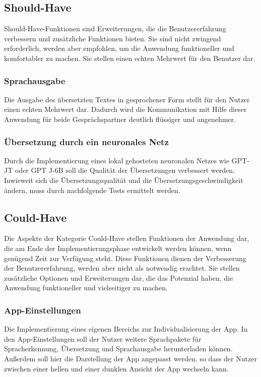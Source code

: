 \subsection{Should-Have}
Should-Have-Funktionen sind Erweiterungen, die die Benutzererfahrung verbessern und zusätzliche Funktionen bieten. Sie sind nicht zwingend erforderlich, werden aber empfohlen, um die Anwendung funktioneller und komfortabler zu machen. Sie stellen einen echten Mehrwert für den Benutzer dar.

\subsubsection{Sprachausgabe}
Die Ausgabe des übersetzten Textes in gesprochener Form stellt für den Nutzer einen echten Mehrwert dar. Dadurch wird die Kommunikation mit Hilfe dieser Anwendung für beide Gesprächspartner deutlich flüssiger und angenehmer.

\subsubsection{Übersetzung durch ein neuronales Netz}
Durch die Implementierung eines lokal gehosteten neuronalen Netzes wie GPT-JT oder GPT J-6B soll die Qualität der Übersetzungen verbessert werden. Inwieweit sich die Übersetzungsqualität und die Übersetzungsgeschwindigkeit ändern, muss durch nachfolgende Tests ermittelt werden.

\subsection{Could-Have}
Die Aspekte der Kategorie Could-Have stellen Funktionen der Anwendung dar, die am Ende der Implementierungsphase entwickelt werden können, wenn genügend Zeit zur Verfügung steht. Diese Funktionen dienen der Verbesserung der Benutzererfahrung, werden aber nicht als notwendig erachtet. Sie stellen zusätzliche Optionen und Erweiterungen dar, die das Potenzial haben, die Anwendung funktioneller und vielseitiger zu machen.

\subsubsection{App-Einstellungen}
Die Implementierung eines eigenen Bereichs zur Individualisierung der App. In den App-Einstellungen soll der Nutzer weitere Sprachpakete für Spracherkennung, Übersetzung und Sprachausgabe herunterladen können. Außerdem soll hier die Darstellung der App angepasst werden, so dass der Nutzer zwischen einer hellen und einer dunklen Ansicht der App wechseln kann. 

